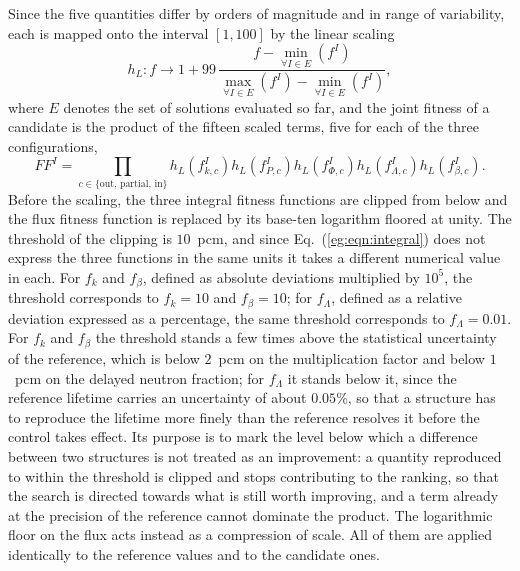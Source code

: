 Since the five quantities differ by orders of magnitude and in range of
variability, each is mapped onto the interval $[1,100]$ by the linear scaling
%
\begin{equation}
  h_L : f \longrightarrow 1 + 99\,
  \frac{f-\min_{\forall I\in E}\left(f^I\right)}
       {\max_{\forall I\in E}\left(f^I\right)-\min_{\forall I\in E}\left(f^I\right)},
  \label{eg:eqn:scaling}
\end{equation}
%
where $E$ denotes the set of solutions evaluated so far, and the joint fitness
of a candidate is the product of the fifteen scaled terms, five for each of the
three configurations,
%
\begin{equation}
  FF^I = \prod_{c\in\{\mathrm{out},\,\mathrm{partial},\,\mathrm{in}\}}
  h_L\!\left(f_{k,c}^I\right) h_L\!\left(f_{P,c}^I\right)
  h_L\!\left(f_{\Phi,c}^I\right) h_L\!\left(f_{\Lambda,c}^I\right)
  h_L\!\left(f_{\beta,c}^I\right).
  \label{eg:eqn:joint}
\end{equation}
%
Before the scaling, the three integral fitness functions are clipped from below
and the flux fitness function is replaced by its base-ten logarithm floored at
unity. The threshold of the clipping is $10$~pcm, and since
Eq.~(\ref{eg:eqn:integral}) does not express the three functions in the same
units it takes a different numerical value in each. For $f_k$ and $f_{\beta}$,
defined as absolute deviations multiplied by $10^{5}$, the threshold
corresponds to $f_k = 10$ and $f_{\beta} = 10$; for $f_{\Lambda}$, defined as a
relative deviation expressed as a percentage, the same threshold corresponds to
$f_{\Lambda} = 0.01$. For $f_k$ and $f_{\beta}$ the threshold
stands a few times above the statistical uncertainty of the reference, which
is below $2$~pcm on the multiplication factor and below $1$~pcm on the delayed
neutron fraction; for $f_{\Lambda}$ it stands below it, since the reference
lifetime carries an uncertainty of about $0.05\%$, so that
a structure has to reproduce the lifetime more finely than the reference
resolves it before the control takes effect. Its purpose is to mark
the level below which a difference between two structures is not treated as an
improvement: a quantity reproduced to within the threshold is clipped and stops
contributing to the ranking, so that the search is directed towards what is
still worth improving, and a term already at the precision of the reference
cannot dominate the product. The logarithmic floor on the flux acts instead as a
compression of scale. All of them are applied identically to the reference
values and to the candidate ones.

